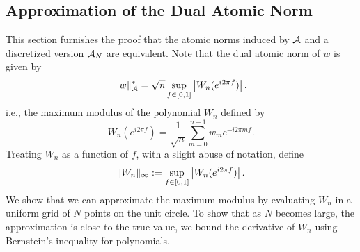 

\subsection{Approximation of the Dual Atomic Norm}
\label{proof:dual-norm-approximation}
This section furnishes the proof that the atomic norms induced by $\mathcal{A}$ and a discretized version $\mathcal{A}_N$ are equivalent. Note that the dual atomic norm of $w$ is given by
\begin{equation}
  \label{eq:maximum-modulus}
  \lVert w\rVert_{\mathcal{A}}^* = \sqrt{n}\sup_{f \in [0,1]} \left| W_n(e^{i2\pi f}) \right|.
\end{equation}
i.e., the maximum modulus of the polynomial $W_n$ defined by
\begin{equation}
\label{eq:random-poly}
W_n(e^{i2\pi f}) =\frac{1}{\sqrt{n}} \sum_{m=0}^{n-1}{w_m e^{-i 2 \pi m f}}.
\end{equation}
Treating $W_n$ as a function of $f$,  with a slight abuse of  notation, define
\begin{equation*}
\lVert W_n\rVert_\infty := \sup_{f \in [0,1]} \left| W_n(e^{i2\pi f}) \right|.
\end{equation*}
We show that we can approximate the maximum modulus by evaluating $W_n$ in a
uniform grid of $N$ points on the unit circle. To show that as $N$ becomes large,
the approximation is close to the true value, we bound the derivative of $W_n$ 
using Bernstein's inequality for polynomials.

